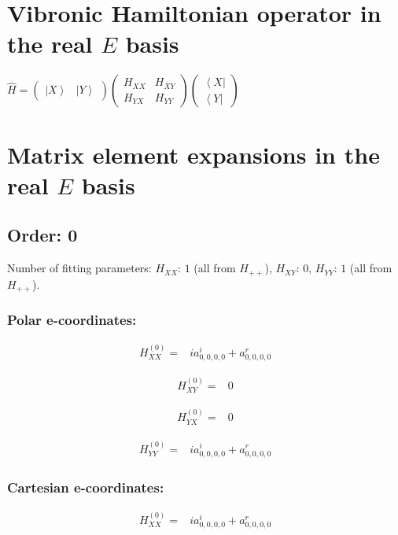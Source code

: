 \documentclass[fleqn]{article}
\begin{document}
\section{Vibronic Hamiltonian operator in the real $E$ basis}
$\hat{H}=\left(\begin{matrix}{\left|X\right\rangle } & {\left|Y\right\rangle }\end{matrix}\right) \left(\begin{matrix}H_{XX} & H_{XY}\\H_{YX} & H_{YY}\end{matrix}\right) \left(\begin{matrix}{\left\langle X\right|}\\{\left\langle Y\right|}\end{matrix}\right)$
\section{Matrix element expansions in the real $E$ basis}
\subsection{Order: 0}
Number of fitting parameters: $H_{XX}$: $1$ (all from $H_{++}$), $H_{XY}$: $0$, $H_{YY}$: $1$ (all from $H_{++}$).
\subsubsection*{Polar e-coordinates:}

\begin{align*}
H_{XX}^{(0)}=&i a^{i}_{0,0,0,0} + a^{r}_{0,0,0,0}
\end{align*}

\begin{align*}
H_{XY}^{(0)}=&0
\end{align*}

\begin{align*}
H_{YX}^{(0)}=&0
\end{align*}

\begin{align*}
H_{YY}^{(0)}=& i a^{i}_{0,0,0,0} +  a^{r}_{0,0,0,0}
\end{align*}
\subsubsection*{Cartesian e-coordinates:}

\begin{align*}
H_{XX}^{(0)}=& i a^{i}_{0,0,0,0} + a^{r}_{0,0,0,0}
\end{align*}
\end{document}
